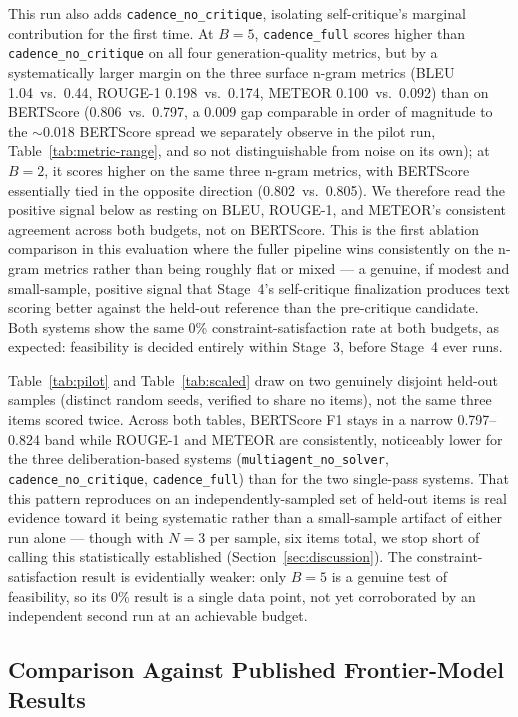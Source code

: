 \documentclass[lettersize,journal]{IEEEtran}
\begin{document}
This run also adds \texttt{cadence\_no\_critique}, isolating self-critique's marginal contribution for the first time. At $B=5$, \texttt{cadence\_full} scores higher than \texttt{cadence\_no\_critique} on all four generation-quality metrics, but by a systematically larger margin on the three surface n-gram metrics (BLEU 1.04~vs.~0.44, ROUGE-1 0.198~vs.~0.174, METEOR 0.100~vs.~0.092) than on BERTScore (0.806~vs.~0.797, a 0.009 gap comparable in order of magnitude to the $\sim$0.018 BERTScore spread we separately observe in the pilot run, Table~\ref{tab:metric-range}, and so not distinguishable from noise on its own); at $B=2$, it scores higher on the same three n-gram metrics, with BERTScore essentially tied in the opposite direction (0.802~vs.~0.805). We therefore read the positive signal below as resting on BLEU, ROUGE-1, and METEOR's consistent agreement across both budgets, not on BERTScore. This is the first ablation comparison in this evaluation where the fuller pipeline wins consistently on the n-gram metrics rather than being roughly flat or mixed --- a genuine, if modest and small-sample, positive signal that Stage~4's self-critique finalization produces text scoring better against the held-out reference than the pre-critique candidate. Both systems show the same 0\% constraint-satisfaction rate at both budgets, as expected: feasibility is decided entirely within Stage~3, before Stage~4 ever runs.

Table~\ref{tab:pilot} and Table~\ref{tab:scaled} draw on two genuinely disjoint held-out samples (distinct random seeds, verified to share no items), not the same three items scored twice. Across both tables, BERTScore F1 stays in a narrow 0.797--0.824 band while ROUGE-1 and METEOR are consistently, noticeably lower for the three deliberation-based systems (\texttt{multiagent\_no\_solver}, \texttt{cadence\_no\_critique}, \texttt{cadence\_full}) than for the two single-pass systems. That this pattern reproduces on an independently-sampled set of held-out items is real evidence toward it being systematic rather than a small-sample artifact of either run alone --- though with $N=3$ per sample, six items total, we stop short of calling this statistically established (Section~\ref{sec:discussion}). The constraint-satisfaction result is evidentially weaker: only $B=5$ is a genuine test of feasibility, so its 0\% result is a single data point, not yet corroborated by an independent second run at an achievable budget.

\subsection{Comparison Against Published Frontier-Model Results}
\label{sec:published-comparison}
\end{document}
